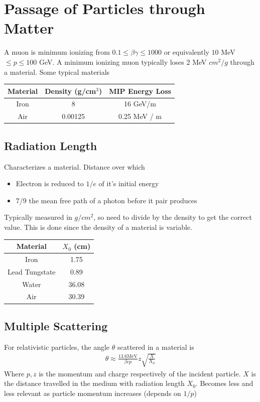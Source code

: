 \section{Passage of Particles through Matter}

A muon is minimum ionizing from $0.1\le \beta\gamma \le 1000$ or equivalently $10$ MeV $\le p\le 100$ GeV. A minimum ionizing muon typically loses 2 MeV $cm^2/g$ through a material. Some typical materials

\begin{center}
    \begin{tabular}{ | c | c| c |} 
        \hline
        Material & Density (g/cm$^3$) & MIP Energy Loss \\ \hline
        Iron & 8 & 16 GeV/m \\
        Air & 0.00125 & 0.25 MeV / m \\
        \hline
    \end{tabular}
\end{center}


\subsection{Radiation Length}
Characterizes a material. Distance over which 
\begin{itemize}
    \item Electron is reduced to $1/e$ of it's initial energy
    \item 7/9 the mean free path of a photon before it pair produces
\end{itemize}
Typically measured in $g/cm^2$, so need to divide by the density to get the correct value. This is done since the density of a material is variable.

\begin{center}
    \begin{tabular}{ | c | c|} 
        \hline
        Material & $X_0$ (cm) \\ \hline
        Iron & 1.75 \\
        Lead Tungstate & 0.89 \\
        Water & 36.08 \\
        Air & 30.39 \\
        \hline
    \end{tabular}
\end{center}



\subsection{Multiple Scattering}
For relativistic particles, the angle $\theta$ scattered in a material is
\begin{align}
\theta \approx \frac{13.6 \textrm{MeV}}{\beta c p}z\sqrt{\frac{X}{X_0}}
\end{align}
Where $p,z$ is the momentum and charge respectively of the incident particle. $X$ is the distance travelled in the medium with radiation length $X_0$. Becomes less and less relevant as particle momentum increases (depends on $1/p$)

